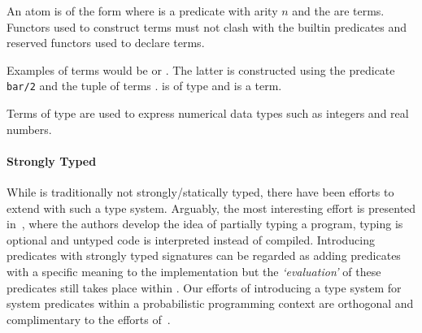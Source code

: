 \begin{definition}
	An atom is of the form  where  is a predicate with arity $n$ and the  are  terms. Functors used to construct  terms must not clash with the builtin predicates and reserved functors used to declare  terms.
\end{definition}

Examples of  terms would be  or . The latter is constructed using the predicate \lstinline{bar/2} and the tuple of  terms .  is of type  and  is a  term.

\begin{definition} Terms of type  are used to express numerical data types such as integers and real numbers.	
\end{definition}

\paragraph{Strongly Typed \prologsty}

While \prologsty is traditionally not strongly/statically typed, there have been efforts to extend \prologsty with such a type system. Arguably, the most interesting effort is presented in~\citep{Schrijvers2008TowardsTP}, where the authors develop the idea of partially typing a \prologsty program, \ie typing is optional and untyped code is interpreted instead of compiled. Introducing predicates with strongly typed signatures can be regarded as adding predicates with a specific meaning to the \prologsty implementation but the {\em `evaluation'} of these predicates still takes place within \prologsty.
Our efforts of introducing a type system for system predicates within a probabilistic programming context are orthogonal and complimentary to the efforts of~\citet{Schrijvers2008TowardsTP}.


